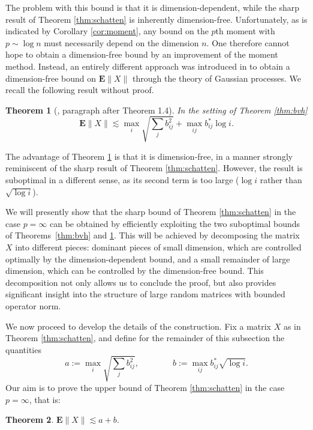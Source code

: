 \documentclass[10pt,reqno]{amsart}
\newtheorem{thm}{Theorem}[section]
\theoremstyle{definition}
\numberwithin{equation}{section}
\numberwithin{figure}{section}
\numberwithin{table}{section}
\begin{document}
The problem with this bound is that it is dimension-dependent, while the 
sharp result of Theorem \ref{thm:schatten} is inherently dimension-free. 
Unfortunately, as is indicated by Corollary \ref{cor:moment}, any bound on 
the $p$th moment with $p\sim\log n$ must necessarily depend on the 
dimension $n$. One therefore cannot hope to obtain a dimension-free bound 
by an improvement of the moment method. Instead, an entirely different 
approach was introduced in \cite{vH17} to obtain a dimension-free bound on 
$\mathbf{E}\|X\|$ through the theory of Gaussian processes. We recall the 
following result without proof.

\begin{thm}[\cite{vH17}, paragraph after Theorem 1.4]
\label{thm:vh}
In the setting of Theorem \ref{thm:bvh}
$$
	\mathbf{E}\|X\|\lesssim
	\max_i\sqrt{\sum_j b_{ij}^2} + 
	\max_{ij}b_{ij}^*\log i.
$$
\end{thm}

The advantage of Theorem \ref{thm:vh} is that it is dimension-free, in a 
manner strongly reminiscent of the sharp result of Theorem 
\ref{thm:schatten}. However, the result is suboptimal in a different 
sense, as its second term is too large ($\log i$ rather than $\sqrt{\log i}$).

We will presently show that the sharp bound of Theorem \ref{thm:schatten} 
in the case $p=\infty$ can be obtained by efficiently exploiting the two 
suboptimal bounds of Theorems~\ref{thm:bvh} and \ref{thm:vh}. This will be 
achieved by decomposing the matrix $X$ into different pieces: dominant 
pieces of small dimension, which are controlled optimally by the 
dimension-dependent bound, and a small remainder of large dimension, which 
can be controlled by the dimension-free bound. This decomposition not only 
allows us to conclude the proof, but also provides significant insight 
into the structure of large random matrices with bounded operator norm.

We now proceed to develop the details of the construction. Fix a matrix 
$X$ as in Theorem \ref{thm:schatten}, and define for the remainder of this 
subsection the quantities
$$
	a := 
        \max_i\sqrt{\sum_j b_{ij}^2},\qquad\qquad
	b :=
        \max_{ij}b_{ij}^*\sqrt{\log i}.
$$
Our aim is to prove the upper bound of Theorem \ref{thm:schatten}
in the case $p=\infty$, that is:

\begin{thm}
\label{thm:latala}
$\mathbf{E}\|X\|\lesssim a+b$.
\end{thm}
\end{document}
